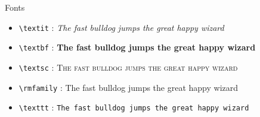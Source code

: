 \documentclass[\string~/GitHub/sthlmNordBeamerTheme/sthlmNordLightDemo.tex]{subfiles}
\begin{document}
\begin{frame}[c]{Fonts}

	\begin{itemize}
	\item \lstinline!\textit! : \textit{The fast bulldog jumps the great happy wizard} \\
    \item \lstinline!\textbf! : \textbf{The fast bulldog jumps the great happy wizard} \\
    \item \lstinline!\textsc! : \textsc{The fast bulldog jumps the great happy wizard} \\
    \item \lstinline!\rmfamily! : {\rmfamily The fast bulldog jumps the great happy wizard} \\
    \item \lstinline!\texttt! : \texttt{The fast bulldog jumps the great happy wizard} \\
	\end{itemize}
\end{frame}
\end{document}
